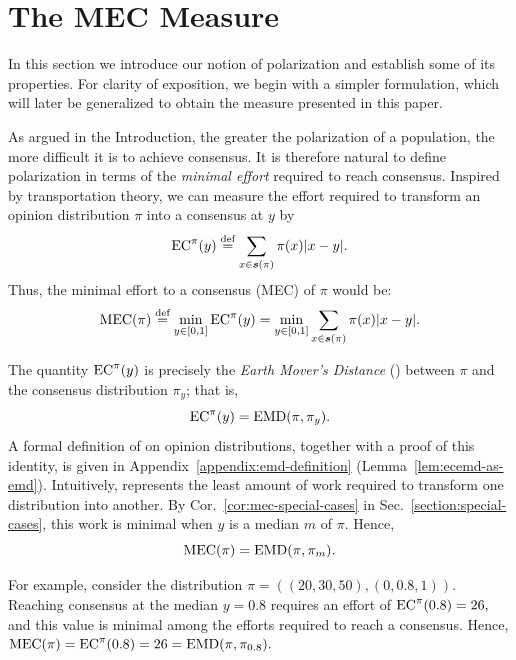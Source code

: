 \section{The MEC Measure}\label{sec:mec}

In this section we introduce our notion of polarization and establish
some of its properties. For clarity of exposition, we begin with a
simpler formulation, which will later be generalized to obtain the
measure presented in this paper.

As argued in the Introduction, the greater the polarization of a
population, the more difficult it is to achieve consensus. It is
therefore natural to define polarization in terms of the \emph{minimal
effort} required to reach consensus. Inspired by transportation
theory, we can measure the effort required to transform an opinion
distribution $\pi$ into a consensus at $y$ by
\begin{equation}\label{eq:emd}   
\ECEMD(y)\defsymbol\sum_{x \in \support(\pi)}\pi(x) |x - y|.
\end{equation}
Thus, the minimal effort to a consensus (MEC) of $\pi$ would be:  
\begin{equation}\label{eq:mecemd}     
\MECEMD(\pi) \defsymbol  \min_{y\in[0,1]} {\ECEMD}(y)=\min_{y\in[0,1]}\sum_{x \in \support(\pi)}\pi(x) |x - y|.
\end{equation}

The quantity $\ECEMD(y)$ is precisely the \emph{Earth Mover's Distance} (\EMDLabel) between
$\pi$ and the consensus distribution $\pi_y$; that is,
\[
\ECEMD(y) = \EMD(\pi,\pi_y).
\]
 A formal definition of \EMDLabel{} on opinion distributions, together with a proof of this identity, is given in Appendix~\ref{appendix:emd-definition} (Lemma~\ref{lem:ecemd-as-emd}). Intuitively, \EMDLabel{} represents the least amount of work required
to transform one distribution into another. By Cor.~\ref{cor:mec-special-cases} in Sec.~\ref{section:special-cases}, this work is minimal when 
$y$ is a median $m$ of $\pi$. Hence,
\begin{equation}
\MECEMD(\pi) = \EMD(\pi,\pi_m).\label{eq:mec-emd-pi-m}
\end{equation}

For example, consider the distribution 
$\pi=((20,30,50),(0,0.8,1))$. 
Reaching consensus at the median $y=0.8$ requires an effort of $
\ECEMD(0.8)=26,
$  
and this value is minimal among the efforts required to reach a consensus. 
Hence,
$
\MECEMD(\pi)=\ECEMD(0.8)=26
= \EMD(\pi,\pi_{0.8}).
$

